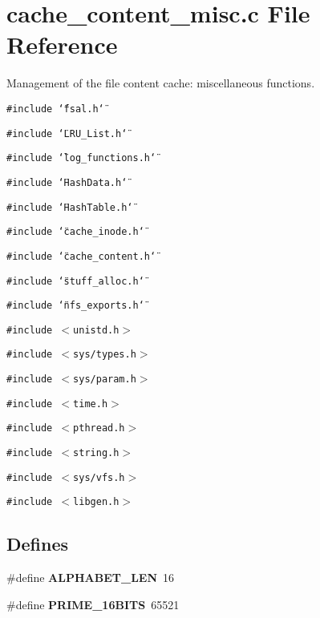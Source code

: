 \section{cache\_\-content\_\-misc.c File Reference}
\label{cache__content__misc_8c}
Management of the file content cache: miscellaneous functions. 

{\tt \#include \char`\"{}fsal.h\char`\"{}}\par
{\tt \#include \char`\"{}LRU\_\-List.h\char`\"{}}\par
{\tt \#include \char`\"{}log\_\-functions.h\char`\"{}}\par
{\tt \#include \char`\"{}Hash\-Data.h\char`\"{}}\par
{\tt \#include \char`\"{}Hash\-Table.h\char`\"{}}\par
{\tt \#include \char`\"{}cache\_\-inode.h\char`\"{}}\par
{\tt \#include \char`\"{}cache\_\-content.h\char`\"{}}\par
{\tt \#include \char`\"{}stuff\_\-alloc.h\char`\"{}}\par
{\tt \#include \char`\"{}nfs\_\-exports.h\char`\"{}}\par
{\tt \#include $<$unistd.h$>$}\par
{\tt \#include $<$sys/types.h$>$}\par
{\tt \#include $<$sys/param.h$>$}\par
{\tt \#include $<$time.h$>$}\par
{\tt \#include $<$pthread.h$>$}\par
{\tt \#include $<$string.h$>$}\par
{\tt \#include $<$sys/vfs.h$>$}\par
{\tt \#include $<$libgen.h$>$}\par
\subsection*{Defines}
\begin{CompactItemize}
\item 
\#define {\bf ALPHABET\_\-LEN}\ 16
\item 
\#define {\bf PRIME\_\-16BITS}\ 65521
\end{CompactItemize}
